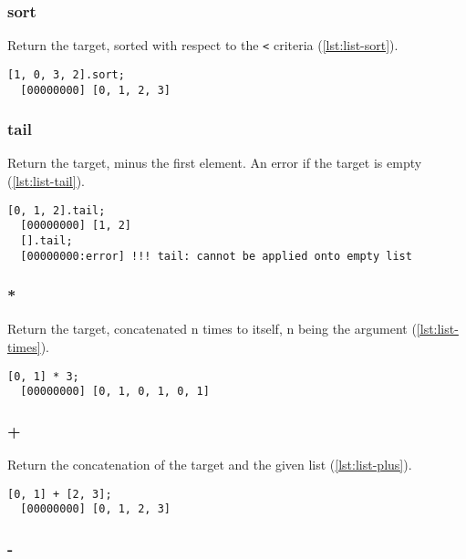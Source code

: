 \subsubsection{sort}

Return the target, sorted with respect to the \lstinline|<| criteria
(\autoref{lst:list-sort}).

\begin{lstlisting}[caption=List.sort, label=lst:list-sort, float=\floatposh]
  [1, 0, 3, 2].sort;
  [00000000] [0, 1, 2, 3]
\end{lstlisting}

\subsubsection{tail}

Return the target, minus the first element. An error if the target is
empty (\autoref{lst:list-tail}).

\begin{lstlisting}[caption=List.tail, label=lst:list-tail, float=\floatposh]
  [0, 1, 2].tail;
  [00000000] [1, 2]
  [].tail;
  [00000000:error] !!! tail: cannot be applied onto empty list
\end{lstlisting}

\subsubsection{*}

Return the target, concatenated n times to itself, n being the
argument (\autoref{lst:list-times}).

\begin{lstlisting}[caption=List.'*', label=lst:list-times,
  float=\floatposh]
  [0, 1] * 3;
  [00000000] [0, 1, 0, 1, 0, 1]
\end{lstlisting}

\subsubsection{+}

Return the concatenation of the target and the given list
(\autoref{lst:list-plus}).

\begin{lstlisting}[caption=List.'+', label=lst:list-plus,
  float=\floatpos]
  [0, 1] + [2, 3];
  [00000000] [0, 1, 2, 3]
\end{lstlisting}

\subsubsection{-}

